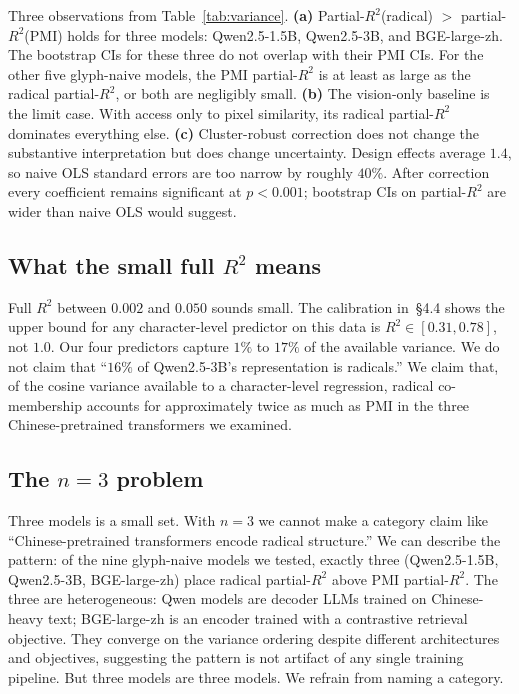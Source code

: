 \documentclass[11pt,a4paper,twocolumn]{article}
\begin{document}
Three observations from Table~\ref{tab:variance}.
\textbf{(a)} Partial-$R^2$(radical) $>$ partial-$R^2$(PMI) holds for
three models: Qwen2.5-1.5B, Qwen2.5-3B, and BGE-large-zh. The bootstrap
CIs for these three do not overlap with their PMI CIs. For the other
five glyph-naive models, the PMI partial-$R^2$ is at least as large as
the radical partial-$R^2$, or both are negligibly small.
\textbf{(b)} The vision-only baseline is the limit case. With access
only to pixel similarity, its radical partial-$R^2$ dominates
everything else.
\textbf{(c)} Cluster-robust correction does not change the substantive
interpretation but does change uncertainty. Design effects average
$1.4$, so naive OLS standard errors are too narrow by roughly $40\%$.
After correction every coefficient remains significant at $p < 0.001$;
bootstrap CIs on partial-$R^2$ are wider than naive OLS would suggest.

\subsection{What the small full $R^2$ means}
Full $R^2$ between $0.002$ and $0.050$ sounds small. The calibration
in~\S4.4 shows the upper bound for any character-level predictor on
this data is $R^2 \in [0.31, 0.78]$, not $1.0$. Our four predictors
capture $1\%$ to $17\%$ of the available variance. We do not claim
that ``$16\%$ of Qwen2.5-3B's representation is radicals.'' We claim
that, of the cosine variance available to a character-level regression,
radical co-membership accounts for approximately twice as much as PMI
in the three Chinese-pretrained transformers we examined.

\subsection{The $n = 3$ problem}
Three models is a small set. With $n = 3$ we cannot make a category
claim like ``Chinese-pretrained transformers encode radical
structure.'' We can describe the pattern: of the nine glyph-naive
models we tested, exactly three (Qwen2.5-1.5B, Qwen2.5-3B,
BGE-large-zh) place radical partial-$R^2$ above PMI partial-$R^2$. The
three are heterogeneous: Qwen models are decoder LLMs trained on
Chinese-heavy text; BGE-large-zh is an encoder trained with a
contrastive retrieval objective. They converge on the variance
ordering despite different architectures and objectives, suggesting
the pattern is not artifact of any single training pipeline. But three
models are three models. We refrain from naming a category.
\end{document}
